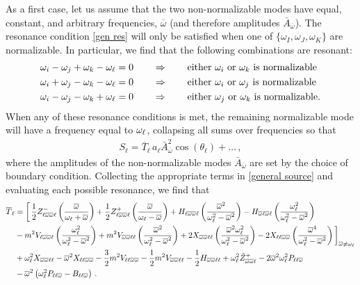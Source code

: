 \documentclass[../PhD.tex]{subfiles}
\newcommand{\thl}{\theta_\ell}
\newcommand{\ob}{\overline{\omega}}
\begin{document}
As a first case, let us assume that the two non-normalizable modes have equal, constant, and arbitrary frequencies, $\ob$ (and therefore amplitudes $\bar A_{\ob}$). The resonance condition \eqref{gen res} will only be satisfied when one of $\{\omega_I, \omega_J, \omega_K \}$ are normalizable. In particular, we find that the following combinations are resonant:
\begin{align}
\label{gen nn res 1}
\omega_i - \omega_j + \omega_k - \omega_\ell &= 0 \qquad \Rightarrow \qquad \text{either $\omega_i$ or $\omega_k$ is normalizable} \\
\omega_i + \omega_j - \omega_k - \omega_\ell &= 0 \qquad \Rightarrow \qquad \text{either $\omega_i$ or $\omega_j$ is normalizable} \\
\omega_i - \omega_j - \omega_k + \omega_\ell &= 0 \qquad \Rightarrow \qquad \text{either $\omega_j$ or $\omega_k$ is normalizable.}
\label{gen nn res 2}
\end{align}
When any of these resonance conditions is met, the remaining normalizable mode will have a frequency equal to $\omega_\ell$, collapsing all sums over frequencies so that
\begin{align}
\label{2genNN}
S_\ell = \overline{T}_{\ell} \, a_\ell \bar A_{\ob}^2 \cos (\thl) + \ldots \, ,
\end{align}
where the amplitudes of the non-normalizable modes $\bar A_{\ob}$ are set by the choice of boundary condition. Collecting the appropriate terms in \eqref{general source} and evaluating each possible resonance, we find that
\begin{align}
\label{S:2NN}
\overline{T}_{\ell} &=  \bigg[ \, \frac{1}{2} Z^-_{\ell\ob\ob\ell} \left( \frac{\ob}{\ol + \ob} \right) + \frac{1}{2} Z^+_{\ell\ob\ob\ell} \left( \frac{\ob}{\ol - \ob} \right)  + H_{\ell \ob \ob \ell} \left( \frac{\ob^2}{\ol^2 - \ob^2} \right)  - H_{\ob\ell\ob\ell} \left(\frac{\ol^2}{\ol^2 - \ob^2} \right) \nonumber \\
%
& - m^2 V_{\ell \ob\ob\ell}  \left(\frac{\ol^2}{\ol^2 - \ob^2} \right) + m^2 V_{\ob\ob\ell\ell} \left( \frac{\ob^2}{\ol^2 - \ob^2} \right) + 2 X_{\ob\ob\ell\ell} \left( \frac{\ob^2 \ol^2}{\ol^2 - \ob^2} \right) - 2 X_{\ell\ell\ob\ob} \left( \frac{\ob^4}{\ol^2 - \ob^2} \right) \bigg]_{\ob \neq \ol} \nonumber \\
%
&  + \ol^2 X_{\ob\ob\ell\ell}  - \ob^2 X_{\ell\ell\ob\ob} - \frac{3}{2} m^2 V_{\ell\ell\ob\ob} - \frac{1}{2} m^2 V_{\ob\ob\ell\ell}  - \frac{1}{2} H_{\ob\ob\ell\ell} + \ol^2 \tilde{Z}^+_{\ob\ob\ell} - 2 \ob^2 \ol^2 P_{\ell\ell\ob} \nonumber \\
%
& - \ob^2 \left( \ol^2 P_{\ell\ell \ob} - B_{\ell\ell\ob} \right) \, .
\end{align}
\end{document}
